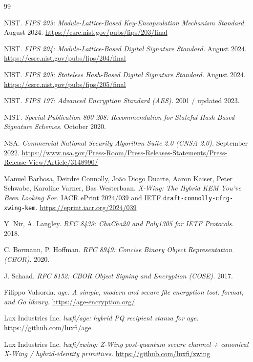 \documentclass[11pt,a4paper]{article}
\begin{document}
\begin{thebibliography}{99}

NIST. \emph{FIPS 203: Module-Lattice-Based Key-Encapsulation Mechanism
Standard.} August 2024.
\url{https://csrc.nist.gov/pubs/fips/203/final}

NIST. \emph{FIPS 204: Module-Lattice-Based Digital Signature Standard.}
August 2024.
\url{https://csrc.nist.gov/pubs/fips/204/final}

NIST. \emph{FIPS 205: Stateless Hash-Based Digital Signature Standard.}
August 2024.
\url{https://csrc.nist.gov/pubs/fips/205/final}

NIST. \emph{FIPS 197: Advanced Encryption Standard (AES).} 2001 /
updated 2023.

NIST. \emph{Special Publication 800-208: Recommendation for Stateful
Hash-Based Signature Schemes.} October 2020.

NSA. \emph{Commercial National Security Algorithm Suite 2.0
(CNSA 2.0).} September 2022.
\url{https://www.nsa.gov/Press-Room/Press-Releases-Statements/Press-Release-View/Article/3148990/}

Manuel Barbosa, Deirdre Connolly, Jo\~ao Diogo Duarte, Aaron Kaiser,
Peter Schwabe, Karoline Varner, Bas Westerbaan.
\emph{X-Wing: The Hybrid KEM You've Been Looking For.}
IACR ePrint 2024/039 and
IETF \texttt{draft-connolly-cfrg-xwing-kem}.
\url{https://eprint.iacr.org/2024/039}

Y. Nir, A. Langley. \emph{RFC 8439: ChaCha20 and Poly1305 for IETF
Protocols.} 2018.

C. Bormann, P. Hoffman. \emph{RFC 8949: Concise Binary Object
Representation (CBOR).} 2020.

J. Schaad. \emph{RFC 8152: CBOR Object Signing and Encryption (COSE).}
2017.

Filippo Valsorda. \emph{age: A simple, modern and secure file
encryption tool, format, and Go library.}
\url{https://age-encryption.org/}

Lux Industries Inc. \emph{luxfi/age: hybrid PQ recipient stanza for
age.}
\url{https://github.com/luxfi/age}

Lux Industries Inc. \emph{luxfi/zwing: Z-Wing post-quantum secure
channel + canonical X-Wing / hybrid-identity primitives.}
\url{https://github.com/luxfi/zwing}


\end{thebibliography}
\end{document}
